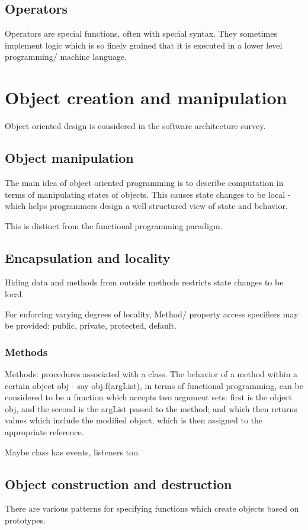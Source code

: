 \documentclass[oneside, article]{memoir}
\begin{document}
\subsection{Operators}
Operators are special functions, often with special syntax. They sometimes implement logic  which is so finely grained that it is executed in a lower level programming/ machine language. 

\section{Object creation and manipulation}
Object oriented design is considered in the software architecture survey.

\subsection{Object manipulation}
The main idea of object oriented programming is to describe computation in terms of manipulating states of objects. This causes state changes to be local - which helps programmers design a well structured view of state and behavior. 

This is distinct from the functional programming paradigm.

\subsection{Encapsulation and locality}
Hiding data and methods from outside methods restricts state changes to be local. 

For enforcing varying degrees of locality, Method/ property access specifiers may be provided: public, private, protected, default. 

\subsubsection{Methods}
Methods: procedures associated with a class. The behavior of a method within a certain object obj - say obj.f(argList), in terms of functional programming, can be considered to be a function which accepts two argument sets: first is the object obj, and the second is the argList passed to the method; and which then returns values which include the modified object, which is then assigned to the appropriate reference.

Maybe class has events, listeners too.

\subsection{Object construction and destruction}
There are various patterns for specifying functions which create objects based on prototypes.
\end{document}
